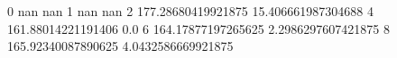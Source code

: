 0 nan nan
1 nan nan
2 177.28680419921875 15.406661987304688
4 161.88014221191406 0.0
6 164.17877197265625 2.2986297607421875
8 165.92340087890625 4.0432586669921875
